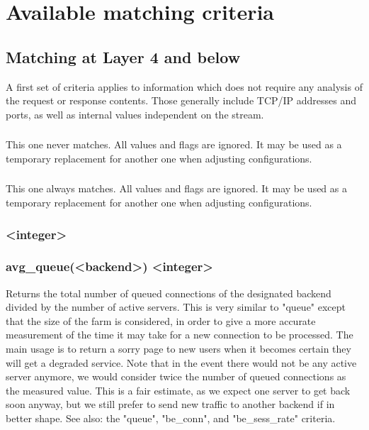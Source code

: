 \section{Available matching criteria}

\subsection{Matching at Layer 4 and below}

A first set of criteria applies to information which does not require any
analysis of the request or response contents. Those generally include TCP/IP
addresses and ports, as well as internal values independent on the stream.

\subsubsection[always\_false]{}
  This one never matches. All values and flags are ignored. It may be used as
  a temporary replacement for another one when adjusting configurations.

\subsubsection[always\_true]{}
  This one always matches. All values and flags are ignored. It may be used as
  a temporary replacement for another one when adjusting configurations.

\subsubsection[avg\_queue]{ <integer>}
\subsubsection*{avg\_queue(<backend>) <integer>}
  Returns the total number of queued connections of the designated backend
  divided by the number of active servers. This is very similar to "queue"
  except that the size of the farm is considered, in order to give a more
  accurate measurement of the time it may take for a new connection to be
  processed. The main usage is to return a sorry page to new users when it
  becomes certain they will get a degraded service. Note that in the event
  there would not be any active server anymore, we would consider twice the
  number of queued connections as the measured value. This is a fair estimate,
  as we expect one server to get back soon anyway, but we still prefer to send
  new traffic to another backend if in better shape. See also: the "queue",
  "be\_conn", and "be\_sess\_rate" criteria.

